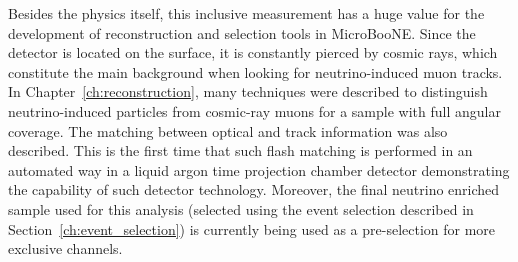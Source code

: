 Besides the physics itself, this inclusive measurement has a huge value for the development of reconstruction and selection tools in MicroBooNE. Since the detector is located on the surface, it is constantly pierced by cosmic rays, which constitute the main background when looking for neutrino-induced muon tracks. In Chapter~\ref{ch:reconstruction}, many techniques were described to distinguish neutrino-induced particles from cosmic-ray muons for a sample with full angular coverage. 
The matching between optical and track information was also described. This is the first time that such flash matching is performed in an automated way in a liquid argon time projection chamber detector demonstrating the capability of such detector technology.
Moreover, the final neutrino enriched sample used for this analysis (selected using the event selection described in Section~\ref{ch:event_selection}) is currently being used as a pre-selection for more exclusive channels.




